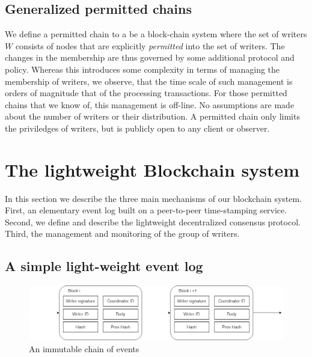 \documentclass[10pt]{article}
\begin{document}


\subsection{Generalized permitted chains}
We define a permitted chain to a be a block-chain system where the set of writers $W$ consists of nodes that are explicitly \emph{permitted} into the set of writers. The changes in the membership are thus governed by some additional protocol and policy. Whereas this introduces some complexity in terms of managing the membership of writers, we observe, that the time scale of such management is orders of magnitude that of the processing transactions. 
For those permitted chains that we know of, this management is off-line. No assumptions are made about the number of writers or their distribution. A permitted chain only limits the priviledges of writers, but is publicly open to any client or observer. 


\section{The lightweight Blockchain system}
\label{blockchain-system}
In this section we describe the three main mechanisms of our blockchain system. First, an elementary event log built on a peer-to-peer time-stamping service. Second, we define and describe the lightweight decentralized consensus protocol. Third, the management and monitoring of the group of writers.


\subsection{A simple light-weight event log}

\begin{figure}
    \centering
    \includegraphics[scale=0.4]{images/chain.png}
    \caption{An immutable chain of events}
    \label{fig:my_label}
\end{figure}
\end{document}
